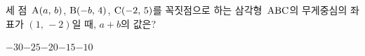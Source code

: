세 점~$\mathrm{A}(a,\,b)$, $\mathrm{B}(-b,\,4)$, $\mathrm{C}(-2,\,5)$를 꼭짓점으로 하는 삼각형~$\mathrm{ABC}$의 무게중심의 좌표가 $(1,\,-2)$일 때, $a+b$의 값은?
\begin{choices32}{$-30$}{$-25$}{$-20$}{$-15$}{$-10$}\end{choices32}
